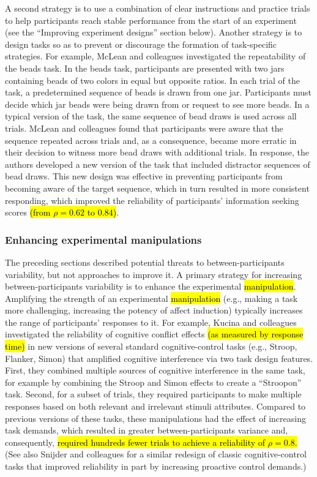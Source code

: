 \documentclass[a4paper,12pt]{article}
\begin{document}
A second strategy is to use a combination of clear instructions and practice trials to help participants reach stable performance from the start of an experiment (see the ``Improving experiment designs'' section below). Another strategy is to design tasks so as to prevent or discourage the formation of task-specific strategies. For example, McLean and colleagues \cite{mclean2018towards} investigated the repeatability of the beads task. In the beads task, participants are presented with two jars containing beads of two colors in equal but opposite ratios. In each trial of the task, a predetermined sequence of beads is drawn from one jar. Participants must decide which jar beads were being drawn from or request to see more beads. In a typical version of the task, the same sequence of bead draws is used across all trials. McLean and colleagues found that participants were aware that the sequence repeated across trials and, as a consequence, became more erratic in their decision to witness more bead draws with additional trials. In response, the authors developed a new version of the task that included distractor sequences of bead draws. This new design was effective in preventing participants from becoming aware of the target sequence, which in turn resulted in more consistent responding, which improved the reliability of participants' information seeking scores \hl{(from $\rho = 0.62$ to $0.84$)}. 

\subsubsection{Enhancing experimental manipulations}

The preceding sections described potential threats to between-participants variability, but not approaches to improve it. A primary strategy for increasing between-participants variability is to enhance the experimental \hl{manipulation}. Amplifying the strength of an experimental \hl{manipulation} (e.g., making a task more challenging, increasing the potency of affect induction) typically increases the range of participants' responses to it. For example, Kucina and colleagues \cite{kucina2022solution} investigated the reliability of cognitive conflict effects \hl{(as measured by response time)} in new versions of several standard cognitive-control tasks (e.g., Stroop, Flanker, Simon) that amplified cognitive interference via two task design features. First, they combined multiple sources of cognitive interference in the same task, for example by combining the Stroop and Simon effects to create a ``Stroopon'' task. Second, for a subset of trials, they required participants to make multiple responses based on both relevant and irrelevant stimuli attributes. Compared to previous versions of these tasks, these manipulations had the effect of increasing task demands, which resulted in greater between-participants variance and, consequently, \hl{required hundreds fewer trials to achieve a reliability of $\rho = 0.8$.} (See also Snijder and colleagues \cite{snijder2022psychometric} for a similar redesign of classic cognitive-control tasks that improved reliability in part by increasing proactive control demands.)
\end{document}
